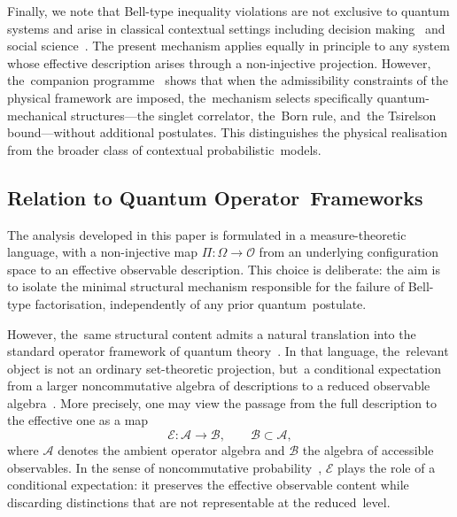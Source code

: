 \documentclass[quantumrep,article,accept,pdftex,oneauthor]{Definitions/mdpi}
\theoremstyle{remark}
\begin{document}
    Finally, we note that Bell-type inequality violations are not exclusive to quantum
    systems and arise in classical contextual settings including decision
    making~\cite{Sulis2025} and social science~\cite{Haven2014}.
    The present mechanism applies equally in principle to any system whose effective
    description arises through a non-injective projection.
    However, the~companion programme~\cite{Q1} shows that when the admissibility
    constraints of the physical framework are imposed, the~mechanism selects specifically
    quantum-mechanical structures---the singlet correlator, the~Born rule, and~the
    Tsirelson bound---without additional postulates.
    This distinguishes the physical realisation from the broader class of contextual
    probabilistic~models.

  \subsection{Relation to Quantum Operator~Frameworks}
    \label{subsec:operator}

    The analysis developed in this paper is formulated in a measure-theoretic language,
    with a non-injective map $\Pi : \Omega \to \mathcal{O}$ from an underlying configuration
    space to an effective observable description.
    This choice is deliberate: the aim is to isolate the minimal structural mechanism
    responsible for the failure of Bell-type factorisation, independently of any prior
    quantum~postulate.

    However, the~same structural content admits a natural translation into the standard
    operator framework of quantum theory~\cite{NielsenChuang2000}.
    In that language, the~relevant object is not an ordinary set-theoretic projection, but~a
    conditional expectation from a larger noncommutative algebra of descriptions to a
    reduced observable algebra~\cite{AccardiCecchini1982}.
    More precisely, one may view the passage from the full description to the effective one
    as a map
\begin{equation}
      \mathcal{E} : \mathcal{A} \to \mathcal{B},
      \qquad \mathcal{B} \subset \mathcal{A},
    \end{equation}
    where $\mathcal{A}$ denotes the ambient operator algebra and $\mathcal{B}$ the algebra
    of accessible observables.
    In the sense of noncommutative probability~\cite{AccardiCecchini1982}, $\mathcal{E}$
    plays the role of a conditional expectation: it preserves the effective observable content
    while discarding distinctions that are not representable at the reduced~level.
\end{document}
